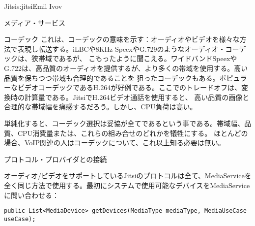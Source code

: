 \begin{aosachapter}{Jitsi}{s:jitsi}{Emil Ivov}
\begin{aosasect1}{メディア・サービス}
\begin{aosasect2}{コーデック}
これは、コーデックの意味を示す：オーディオやビデオを様々な方法で表現し転送する。iLBCや8KHz SpeexやG.729のようなオーディオ・コーデックは、狭帯域であるが、
こもったように聞こえる。ワイドバンドSpeexやG.722は、高品質のオーディオを提供するが、より多くの帯域を使用する。高い品質を保ちつつ帯域も合理的であることを
狙ったコーデックもある。ポピュラーなビデオコーデックであるH.264が好例である。ここでのトレードオフは、変換時の計算量である。JitsiでH.264ビデオ通話を使用すると、
高い品質の画像と合理的な帯域幅を痛感するだろう。しかし、CPU負荷は高い。

単純化すると、コーデック選択は妥協が全てであるという事である。帯域幅、品質、CPU消費量または、これらの組み合せのどれかを犠牲にする。
ほとんどの場合、VoIP関連の人はコーデックについて、これ以上知る必要は無い。

\end{aosasect2}

\begin{aosasect2}{プロトコル・プロバイダとの接続}

オーディオ/ビデオをサポートしているJitsiのプロトコルは全て、MediaServiceを全く同じ方法で使用する。最初にシステムで使用可能なデバイスをMediaServiceに問い合わせる：

\begin{verbatim}
public List<MediaDevice> getDevices(MediaType mediaType, MediaUseCase useCase);
\end{verbatim}


\end{aosasect2}
\end{aosasect1}
\end{aosachapter}
